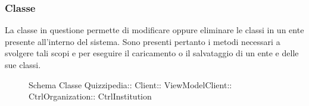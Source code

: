 \subsubsection{Classe }
La classe in questione permette di modificare oppure eliminare le classi in un ente presente all'interno del sistema.
Sono presenti pertanto i metodi necessari a svolgere tali scopi e per eseguire il caricamento o il salvataggio di un ente e delle sue classi.
\begin{figure}[H]
\centering
\noindent{}
\caption[Schema Classe CtrlInstitution]{Schema Classe Quizzipedia:: Client:: ViewModelClient:: CtrlOrganization:: CtrlInstitution}
\end{figure}
